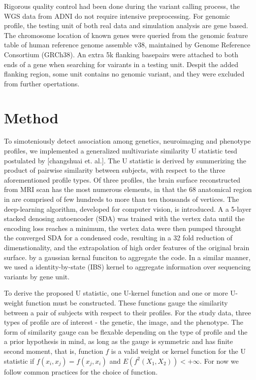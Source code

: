 \documentclass[twocolumn]{article}
\begin{document}
Rigorous quality control had been done during the variant calling process, the WGS data from ADNI do not require intensive preprocessing. For genomic profile, the testing unit of both real data and simulation analysis are gene based. The chromosome location of known genes were queried from the genomic feature table of human reference genome assemble v38, maintained by Genome Reference Consortium (GRCh38). An extra 5k flanking basepairs were attached to both ends of a gene when searching for vairants in a testing unit. Despit the added flanking region, some unit contains no genomic variant, and they were excluded from further opertations.

\section{Method}
To simoteniously detect association among genetics, neuroimaging and phenotype profiles, we implemented a generalized multivariate similarity U statistic tesd postulated by [changshuai et. al.]. The U statistic is derived by summerizing the product of pairwise similarity between subjects, with respect to the three aforementioned profile types. Of three profiles, the brain surface reconstructed from MRI scan has the most numerous elements, in that the 68 anatomical region in are comprised of few hundreds to more than ten thousands of vertices. The deep-learning algorithm, developed for computer vision, is introduced. A a 5-layer stacked denosing autoencoder (SDA) was trained with the vertex data until the encoding loss reaches a minimum, the vertex data were then pumped throught the converged SDA for a condensed code, resulting in a 32 fold reduction of dimenstionality, and the extrapolation of high order features of the original brain surface.  by a gaussian kernal funciton to aggregate the code. In a similar manner, we used a identity-by-state (IBS) kernel to aggregate information over sequencing variants by gene unit. 

To derive the proposed U statistic, one U-kernel function and one or more U-weight function must be constructed. These functions gauge the similarity between a pair of subjects with respect to their profiles. For the study data, three types of profile are of interest - the genetic, the image, and the phenotype. The form of similarity gauge can be flexable depending on the type of profile and the a prior hypothesis in mind, as long as the gauge is symmetric and has finite second moment, that is, function $f$ is a valid weight or kernel function for the U statistic if $f(x_i,x_j)=f(x_j,x_i)$ and $E(f^2(X_1, X_2))<+\infty$. For now we follow common practices for the choice of function.
\end{document}
